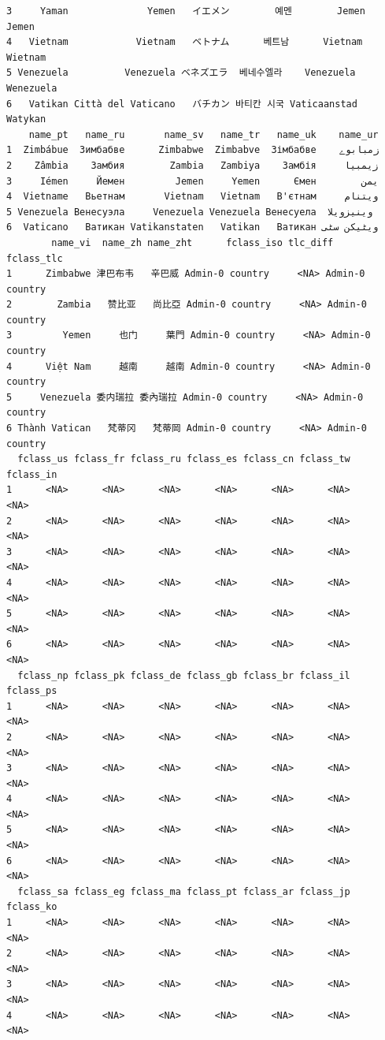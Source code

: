 \documentclass[
  letterpaper,
  DIV=11,
  numbers=noendperiod,
  oneside]{scrreprt}
\begin{document}
\begin{verbatim}
3     Yaman              Yemen   イエメン        예멘        Jemen     Jemen
4   Vietnam            Vietnam   ベトナム      베트남      Vietnam   Wietnam
5 Venezuela          Venezuela ベネズエラ  베네수엘라    Venezuela Wenezuela
6   Vatikan Città del Vaticano   バチカン 바티칸 시국 Vaticaanstad   Watykan
    name_pt   name_ru       name_sv   name_tr   name_uk    name_ur
1  Zimbábue  Зимбабве      Zimbabwe  Zimbabve  Зімбабве    زمبابوے
2    Zâmbia    Замбия        Zambia   Zambiya    Замбія     زیمبیا
3     Iémen     Йемен         Jemen     Yemen      Ємен        یمن
4  Vietname   Вьетнам       Vietnam   Vietnam   В'єтнам     ویتنام
5 Venezuela Венесуэла     Venezuela Venezuela Венесуела  وینیزویلا
6  Vaticano   Ватикан Vatikanstaten   Vatikan   Ватикан ویٹیکن سٹی
        name_vi  name_zh name_zht      fclass_iso tlc_diff      fclass_tlc
1      Zimbabwe 津巴布韦   辛巴威 Admin-0 country     <NA> Admin-0 country
2        Zambia   赞比亚   尚比亞 Admin-0 country     <NA> Admin-0 country
3         Yemen     也门     葉門 Admin-0 country     <NA> Admin-0 country
4      Việt Nam     越南     越南 Admin-0 country     <NA> Admin-0 country
5     Venezuela 委内瑞拉 委內瑞拉 Admin-0 country     <NA> Admin-0 country
6 Thành Vatican   梵蒂冈   梵蒂岡 Admin-0 country     <NA> Admin-0 country
  fclass_us fclass_fr fclass_ru fclass_es fclass_cn fclass_tw fclass_in
1      <NA>      <NA>      <NA>      <NA>      <NA>      <NA>      <NA>
2      <NA>      <NA>      <NA>      <NA>      <NA>      <NA>      <NA>
3      <NA>      <NA>      <NA>      <NA>      <NA>      <NA>      <NA>
4      <NA>      <NA>      <NA>      <NA>      <NA>      <NA>      <NA>
5      <NA>      <NA>      <NA>      <NA>      <NA>      <NA>      <NA>
6      <NA>      <NA>      <NA>      <NA>      <NA>      <NA>      <NA>
  fclass_np fclass_pk fclass_de fclass_gb fclass_br fclass_il fclass_ps
1      <NA>      <NA>      <NA>      <NA>      <NA>      <NA>      <NA>
2      <NA>      <NA>      <NA>      <NA>      <NA>      <NA>      <NA>
3      <NA>      <NA>      <NA>      <NA>      <NA>      <NA>      <NA>
4      <NA>      <NA>      <NA>      <NA>      <NA>      <NA>      <NA>
5      <NA>      <NA>      <NA>      <NA>      <NA>      <NA>      <NA>
6      <NA>      <NA>      <NA>      <NA>      <NA>      <NA>      <NA>
  fclass_sa fclass_eg fclass_ma fclass_pt fclass_ar fclass_jp fclass_ko
1      <NA>      <NA>      <NA>      <NA>      <NA>      <NA>      <NA>
2      <NA>      <NA>      <NA>      <NA>      <NA>      <NA>      <NA>
3      <NA>      <NA>      <NA>      <NA>      <NA>      <NA>      <NA>
4      <NA>      <NA>      <NA>      <NA>      <NA>      <NA>      <NA>

\end{verbatim}
\end{document}
